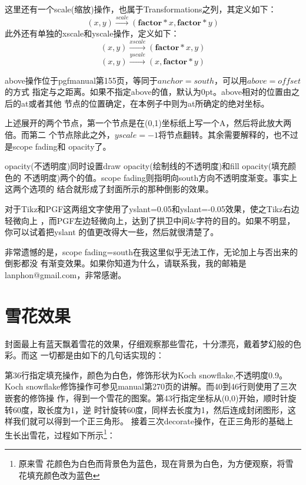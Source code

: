 \documentclass[10pt,a4paper,titlepage]{article}
\begin{document}
这里还有一个scale(缩放)操作，也属于Transformations之列，其定义如下：
\begin{equation}
(x,y) \stackrel{scale}{\longrightarrow}(\textbf{factor}*x,\mathbf{factor}*y)
\end{equation}
此外还有单独的xscale和yscale操作，定义如下：
\begin{equation}
(x,y) \stackrel{xscale}{\longrightarrow}(\textbf{factor}*x,y)
\end{equation}
\begin{equation}
(x,y) \stackrel{yscale}{\longrightarrow}(x,\mathbf{factor}*y)
\end{equation}

above操作位于pgfmanual第155页，等同于$anchor=south$，可以用$above=offset$的方式
指定与之距离。如果不指定above的值，默认为0pt。above相对的位置由之后的at或者其他
节点的位置确定，在本例子中则为at所确定的绝对坐标。

上述展开的两个节点，第一个节点是在(0,1)坐标纸上写一个A，然后将此放大两倍。而第二
个节点除此之外，$yscale=-1$将节点翻转。其余需要解释的，也不过是scope fading和
opacity了。

opacity(不透明度)同时设置draw opacity(绘制线的不透明度)和fill opacity(填充颜色的
不透明度)两个的值。scope fading则指明向south方向不透明度渐变。事实上这两个选项的
结合就形成了封面所示的那种倒影的效果。

对于Tikz和PGF这两组文字使用了yslant=0.05和yslant=-0.05效果，使之Tikz右边轻微向上
，而PGF左边轻微向上，达到了拱卫中间\&字符的目的。如果不明显，你可以试着把yslant
的值更改得大一些，然后就很清楚了。

非常遗憾的是，scope fading=south在我这里似乎无法工作，无论加上与否出来的倒影都没
有渐变效果。如果你知道为什么，请联系我，我的邮箱是lanphon@gmail.com，非常感谢。

\section{雪花效果}

封面最上有蓝天飘着雪花的效果，仔细观察那些雪花，十分漂亮，戴着梦幻般的色彩。而这
一切都是由如下的几句话实现的：



第36行指定填充操作，颜色为白色，修饰形状为Koch snowflake,不透明度0.9。Koch
snowflake修饰操作可参见manual第270页的讲解。而40到46行则使用了三次嵌套的修饰操
作，得到一个雪花的图案。第43行指定坐标从(0,0)开始，顺时针旋转60度，取长度为1，逆
时针旋转60度，同样去长度为1，然后连成封闭图形，这样我们就可以得到一个正三角形。
接着三次decorate操作，在正三角形的基础上生长出雪花，过程如下所示\footnote{原来雪
花颜色为白色而背景色为蓝色，现在背景为白色，为方便观察，将雪花填充颜色改为蓝色}：
\end{document}
